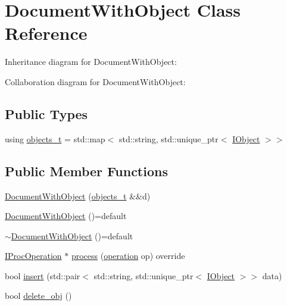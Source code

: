 \hypertarget{class_document_with_object}{}\section{Document\+With\+Object Class Reference}
\label{class_document_with_object}


Inheritance diagram for Document\+With\+Object\+:


Collaboration diagram for Document\+With\+Object\+:
\subsection*{Public Types}
\begin{DoxyCompactItemize}
\item 
using \hyperlink{class_document_with_object_a955b8e449e2c7a393594163f3a122770}{objects\+\_\+t} = std\+::map$<$ std\+::string, std\+::unique\+\_\+ptr$<$ \hyperlink{struct_i_object}{I\+Object} $>$$>$
\end{DoxyCompactItemize}
\subsection*{Public Member Functions}
\begin{DoxyCompactItemize}
\item 
\hyperlink{class_document_with_object_aa084d636c7cc75deca1df00a3a0edbe9}{Document\+With\+Object} (\hyperlink{class_document_with_object_a955b8e449e2c7a393594163f3a122770}{objects\+\_\+t} \&\&d)
\item 
\hyperlink{class_document_with_object_a55bdb2e586b8afdaa86d6770a4829aa1}{Document\+With\+Object} ()=default
\item 
\hyperlink{class_document_with_object_a8dd13839e413d14652e6a83dee68e0b4}{$\sim$\+Document\+With\+Object} ()=default
\item 
\hyperlink{struct_i_proc_operation}{I\+Proc\+Operation} $\ast$ \hyperlink{class_document_with_object_a97b7ac150c854626ceb8cc4af4c0766e}{process} (\hyperlink{main_8cpp_ad34e7fb3c33543e9f3a1e48486fa7692}{operation} op) override
\item 
bool \hyperlink{class_document_with_object_a1c7dddf954158f79c4ebb061a8228502}{insert} (std\+::pair$<$ std\+::string, std\+::unique\+\_\+ptr$<$ \hyperlink{struct_i_object}{I\+Object} $>$$>$ data)
\item 
bool \hyperlink{class_document_with_object_acb2f51e9731ef351e1fe7b5f5098ff43}{delete\+\_\+obj} ()
\end{DoxyCompactItemize}


